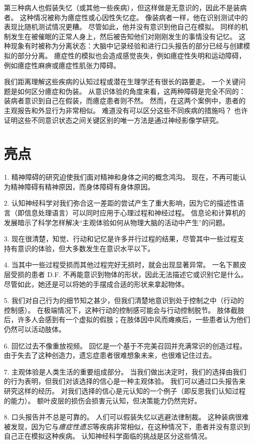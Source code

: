 第三种病人也假装失忆（或其他一些疾病），但这样做是无意识的，因此不是装病者。
这种情况被称为癔症性或心因性失忆症。
像装病者一样，他在识别测试中的表现比随机测试情况更糟。
尽管如此，他并没有意识到他自己在模拟。
同样的机制发生在被催眠的正常人身上，然后被告知他们对刚刚发生的事情没有记忆。
这种现象有时被称为分离状态：大脑中记录经验和进行口头报告的部分已经与创建模拟的部分分离。
癔症性的模拟也会造成感觉丧失，例如癔症性失明和运动障碍，例如癔症性麻痹或癔症性肌张力障碍。


我们距离理解这些疾病的认知过程或潜在生理学还有很长的路要走。
一个关键问题是如何区分癔症和伪装。
从意识体验的角度来看，这两种障碍是完全不同的：
装病者意识到自己在假装，而癔症患者则不然。
然而，在这两个案例中，患者的主观报告和外显行为非常相似。
难道没有可以区分这些不同疾病的措施吗？
也许证明这些不同意识状态之间关键区别的唯一方法是通过神经影像学研究。



\section{亮点}

1. 精神障碍的研究迫使我们面对精神和身体之间的概念鸿沟。
现在，不再可能认为精神障碍有精神原因，而身体障碍有身体原因。


2. 认知神经科学对我们弥合这一差距的尝试产生了重大影响，因为它的描述性语言（即信息处理语言）可以同时应用于心理过程和神经过程。
信息论和计算机的发展暗示了科学怎样解决“主观体验如何从物理大脑的活动中产生”的问题。


3. 现在很清楚，知觉、行动和记忆是许多并行过程的结果，尽管其中一些过程支持有意识的体验，但大多数发生在意识水平以下。 


4. 当其中一些过程受损而其他过程完好无损时，就会出现显著异常。
一名下颞皮层受损的患者 D.F. 不再能意识到物体的形状，因此无法描述它或识别它是什么。
尽管如此，她还是可以将她的手摆成合适的形状来拿起物体。


5. 我们对自己行为的细节知之甚少，但我们清楚地意识到处于控制之中（行动的控制感）。
在极端情况下，这种行动的控制感可能会与行动控制脱节。
肢体截肢后，许多人会感到有一个虚拟的假肢；在肢体因中风而瘫痪后，一些患者认为他们仍然可以活动肢体。
 

6. 回忆过去不像重放视频。
回忆是一个基于不完美召回并充满常识的创造过程。
由于失去了这种创造力，遗忘症患者很难想象未来，也很难记住过去。


7. 主观体验是人类生活的重要组成部分。
当我们做出决定时，我们的选择由我们的行为表明，但我们对该选择的信心是一种主观体验。
我们可以通过口头报告来研究这样的经历。
对我们选择的信心是元认知的一个例子（即反思我们认知过程的能力）。
额叶皮层的损伤会损害元认知，但决策能力仍然完好。 


8. 口头报告并不总是可靠的。
人们可以假装失忆以逃避法律制裁。
这种装病很难被发现，因为它与\textit{癔症性遗忘}等疾病非常相似，在这种情况下，患者并没有意识到自己正在模拟这种疾病。
认知神经科学面临的挑战是区分这些情况。

